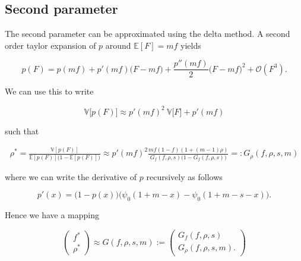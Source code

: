 \documentclass[american, abstract=on]{scrartcl}
\newcommand{\E}{\mathbb{E}}
\newcommand{\V}{\mathbb{V}}
\begin{document}
\subsection{Second parameter}

The second parameter can be approximated using the delta method. A second order taylor expansion of $p$ around $\E[F] = m f$ yields

\begin{equation}
  p(F) = p(m f) + p'(m f) \big(F - m f\big) + \frac{p''(m f)}{2} \big(F - m f\big)^2 + \mathcal{O}\left(F^3\right).
\end{equation}

We can use this to write


\begin{equation}
  \V\big[p(F)\big] \approx p'(m f)^2 \  \V\big[F\big] + p'(mf)
\end{equation}

such that

\begin{equation}
  \begin{split}
    \rho^* = \frac{\V[p(F)]}{\E[p(F)] \big( 1 -  \E[p(F)]\big)} \approx p'(m f)^2 \frac{m f (1 - f) (1 + (m - 1) \rho)}{ G_f(f, \rho, s) \big( 1 -  G_f(f, \rho, s)\big)} =:  G_\rho(f, \rho, s, m)
  \end{split}
\end{equation}

where we can write the derivative of $p$ recursively as follows

\begin{equation}
  p'(x) = \big(1 - p(x)\big) \Big( \psi_0(1 + m - x) - \psi_0(1 + m - s - x) \Big).
\end{equation}

Hence we have a mapping

\begin{equation}
  \begin{pmatrix}
    f^* \\ \rho^*
  \end{pmatrix} \approx G(f, \rho, s, m) := \begin{pmatrix}
    G_f(f, \rho, s) \\ G_\rho(f, \rho, s, m).
  \end{pmatrix}
\end{equation}
\end{document}
